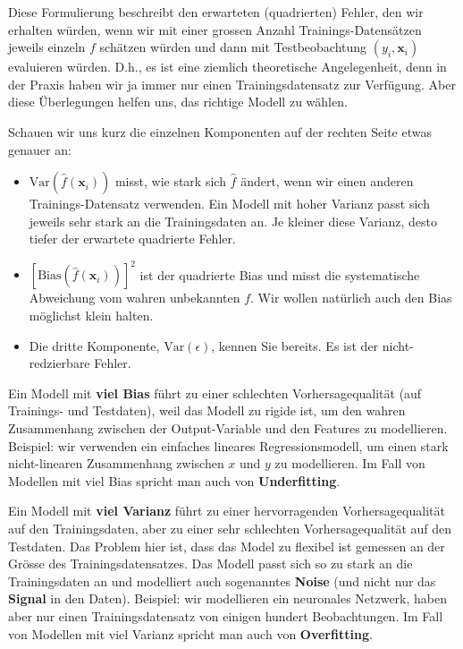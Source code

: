 \documentclass[
]{book}
\providecommand{\tightlist}{%
  \setlength{\itemsep}{0pt}\setlength{\parskip}{0pt}}
\begin{document}
Diese Formulierung beschreibt den erwarteten (quadrierten) Fehler, den wir erhalten würden, wenn wir mit einer grossen Anzahl Trainings-Datensätzen jeweils einzeln \(f\) schätzen würden und dann mit Testbeobachtung \((y_i,\mathbf{x}_i)\) evaluieren würden. D.h., es ist eine ziemlich theoretische Angelegenheit, denn in der Praxis haben wir ja immer nur einen Trainingsdatensatz zur Verfügung. Aber diese Überlegungen helfen uns, das richtige Modell zu wählen.

Schauen wir uns kurz die einzelnen Komponenten auf der rechten Seite etwas genauer an:

\begin{itemize}
\tightlist
\item
  \(\text{Var}\left(\hat{f}(\mathbf{x}_i)\right)\) misst, wie stark sich \(\hat{f}\) ändert, wenn wir einen anderen Trainings-Datensatz verwenden. Ein Modell mit hoher Varianz passt sich jeweils sehr stark an die Trainingsdaten an. Je kleiner diese Varianz, desto tiefer der erwartete quadrierte Fehler.
\item
  \(\left[\text{Bias}\left(\hat{f}(\mathbf{x}_i)\right)\right]^2\) ist der quadrierte Bias und misst die systematische Abweichung vom wahren unbekannten \(f\). Wir wollen natürlich auch den Bias möglichst klein halten.
\item
  Die dritte Komponente, \(\text{Var}(\epsilon)\), kennen Sie bereits. Es ist der nicht-redzierbare Fehler.
\end{itemize}

Ein Modell mit \textbf{viel Bias} führt zu einer schlechten Vorhersagequalität (auf Trainings- und Testdaten), weil das Modell zu rigide ist, um den wahren Zusammenhang zwischen der Output-Variable und den Features zu modellieren. Beispiel: wir verwenden ein einfaches lineares Regressionsmodell, um einen stark nicht-linearen Zusammenhang zwischen \(x\) und \(y\) zu modellieren. Im Fall von Modellen mit viel Bias spricht man auch von \textbf{Underfitting}.

Ein Modell mit \textbf{viel Varianz} führt zu einer hervorragenden Vorhersagequalität auf den Trainingsdaten, aber zu einer sehr schlechten Vorhersagequalität auf den Testdaten. Das Problem hier ist, dass das Model zu flexibel ist gemessen an der Grösse des Trainingsdatensatzes. Das Modell passt sich so zu stark an die Trainingsdaten an und modelliert auch sogenanntes \textbf{Noise} (und nicht nur das \textbf{Signal} in den Daten). Beispiel: wir modellieren ein neuronales Netzwerk, haben aber nur einen Trainingsdatensatz von einigen hundert Beobachtungen. Im Fall von Modellen mit viel Varianz spricht man auch von \textbf{Overfitting}.
\end{document}

